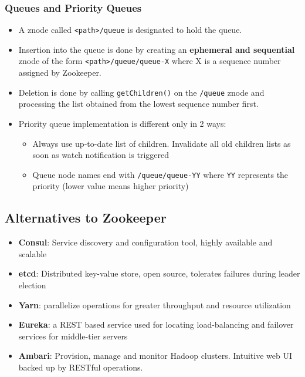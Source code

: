 \documentclass{article}
\begin{document}
\subsubsection{Queues and Priority Queues}
\begin{itemize}
    \item A znode called \texttt{<path>/queue} is designated to hold the queue. 
    
    \item Insertion into the queue is done by creating an \textbf{ephemeral and sequential} znode of the form \texttt{<path>/queue/queue-X} where X is a sequence number assigned by Zookeeper. 
    
    \item Deletion is done by calling \texttt{getChildren()} on the \texttt{/queue} znode and processing the list obtained from the lowest sequence number first.
    
    \item Priority queue implementation is different only in 2 ways:
    \begin{itemize}
        \item Always use up-to-date list of children. Invalidate all old children lists as soon as watch notification is triggered
        
        \item Queue node names end with \texttt{/queue/queue-YY} where \texttt{YY} represents the priority (lower value means higher priority)
    \end{itemize}
\end{itemize}

\subsection{Alternatives to Zookeeper}
\begin{itemize}
    \item \textbf{Consul}: Service discovery and configuration tool, highly available and scalable
    
    \item \textbf{etcd}: Distributed key-value store, open source, tolerates failures during leader election
    
    \item \textbf{Yarn}: parallelize operations for greater throughput and resource utilization
    
    \item \textbf{Eureka}: a REST based service used for locating load-balancing and failover services for middle-tier servers
    
    \item \textbf{Ambari}: Provision, manage and monitor Hadoop clusters. Intuitive web UI backed up by RESTful operations. 
\end{itemize}
\end{document}
